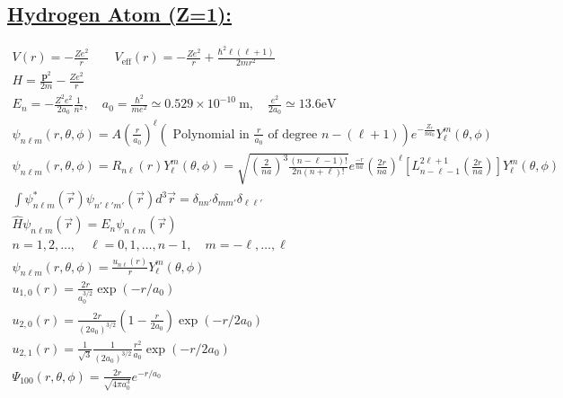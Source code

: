 \documentclass[a4paper,12pt]{article}
\begin{document}
\subsection*{\underline{Hydrogen Atom (Z=1):}}
\begin{gather}
    V(r) = - \frac{Z e^2}{r} \qquad V_\text{eff}(r) = - \frac{Z e^2}{r} + \frac{\hbar^2 \ell (\ell +1)}{2m r^2} \\
    H=\frac{\mathbf{p}^{2}}{2 m}-\frac{Z e^{2}}{r} \\
    E_{n}=-\frac{Z^{2} e^{2}}{2 a_{0}} \frac{1}{n^{2}}, \quad a_{0}=\frac{\hbar^{2}}{m e^{2}} \simeq 0.529 \times 10^{-10} \mathrm{~m}, \quad \frac{e^{2}}{2 a_{0}} \simeq 13.6 \mathrm{eV} \\
    \psi_{n \ell m}(r, \theta,\phi)=A\left(\frac{r}{a_{0}}\right)^{\ell}\left(\text { Polynomial in } \frac{r}{a_{0}} \text { of degree } n-(\ell+1)\right) e^{-\frac{Z_{r}}{n a_{0}}} {Y_{\ell}^m}(\theta, \phi) \\
    \psi_{n\ell m}(r, \theta, \phi) = R_{n \ell}(r){Y_{\ell}^m}(\theta, \phi)= \sqrt{\left(\frac{2}{na}\right)^3\frac{\left(n-\ell-1\right)!}{2n(n+\ell)!}}e^{\frac{-r}{na}}\left(\frac{2r}{na}\right)^\ell [L_{n-\ell-1}^{2\ell+1}\left(\frac{2r}{na}\right)]{Y_{\ell}^m}(\theta, \phi)\\
    \int\psi^*_{n \ell m}(\vec{r})\psi_{n' \ell ' m'}(\vec{r})d^3\vec r=\delta_{nn'}\delta_{mm'}\delta_{\ell\ell '}\\
    \hat{H}\psi_{n \ell m}(\vec{r}) = E_n\psi_{n \ell m}(\vec{r})\\
    n=1,2, \ldots, \quad \ell=0,1, \ldots, n-1, \quad m=-\ell, \ldots, \ell \\
    \psi_{n\ell m}(r, \theta, \phi)=\frac{u_{n \ell}(r)}{r} {Y_{\ell}^m}(\theta, \phi) \\
    u_{1,0}(r)=\frac{2 r}{a_{0}^{3 / 2}} \exp \left(-r / a_{0}\right) \\
    u_{2,0}(r)=\frac{2 r}{\left(2 a_{0}\right)^{3 / 2}}\left(1-\frac{r}{2 a_{0}}\right) \exp \left(-r / 2 a_{0}\right) \\
    u_{2,1}(r)=\frac{1}{\sqrt{3}} \frac{1}{\left(2 a_{0}\right)^{3 / 2}} \frac{r^{2}}{a_{0}} \exp \left(-r / 2 a_{0}\right) \\
    \Psi_{100}(r, \theta, \phi) = \frac{2r}{\sqrt{4 \pi a_0^3}} e^{-r/a_0}
\end{gather}
\end{document}
